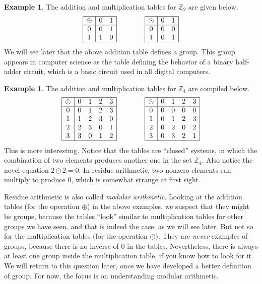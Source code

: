 \documentclass[11pt]{article}
\theoremstyle{definition}
\newtheorem{example}[thm]{Example}
\newcommand{\Z}{\mathbb{Z}} %
\begin{document}
\begin{example} 
The addition and multiplication tables for $\Z_2$ are given below. 
\[
\begin{array}{|c|cc|} \hline
\oplus&0&1\\ \hline 0&0&1\\ 1&1&0\\ \hline
\end{array}
\qquad \qquad
\begin{array}{|c|cc|} \hline
\odot &0&1\\ \hline
0&0&0\\
1&0&1\\
\hline
\end{array}
\]
We will see later that the above addition table defines a group. This
group appears in computer science as the table defining the behavior
of a binary half-adder circuit, which is a basic circuit used in all
digital computers. 
\end{example}



\begin{example} 
The addition and multiplication tables for $\Z_4$ are compiled below. 
\[
\begin{array}{|c|cccc|} \hline
\oplus&0&1&2&3\\ \hline 
0&0&1&2&3\\ 1&1&2&3&0\\ 
2&2&3&0&1\\ 3&3&0&1&2\\ \hline
\end{array}
\qquad \qquad
\begin{array}{|c|cccc|} \hline
\odot &0&1&2&3\\ \hline
0&0&0&0&0\\
1&0&1&2&3\\ 
2&0&2&0&2\\ 
3&0&3&2&1\\ \hline
\end{array}
\]
This is more interesting. Notice that the tables are ``closed''
systems, in which the combination of two elements produces another one
in the set $\Z_4$. Also notice the novel equation $2 \odot 2 = 0$. In
residue arithmetic, two nonzero elements can multiply to produce $0$,
which is somewhat strange at first sight.
\end{example}

Residue arithmetic is also called \emph{modular arithmetic}. Looking
at the addition tables (for the operation $\oplus$) in the above
examples, we suspect that they might be groups, because the tables
``look'' similar to multiplication tables for other groups we have
seen, and that is indeed the case, as we will see later. But not so
for the multiplication tables (for the operation $\odot$). They are
\emph{never} examples of groups, because there is no inverse of $0$
in the tables. Nevertheless, there is always at least one group inside
the multiplication table, if you know how to look for it. We will
return to this question later, once we have developed a better
definition of group. For now, the focus is on understanding modular
arithmetic.
\end{document}
